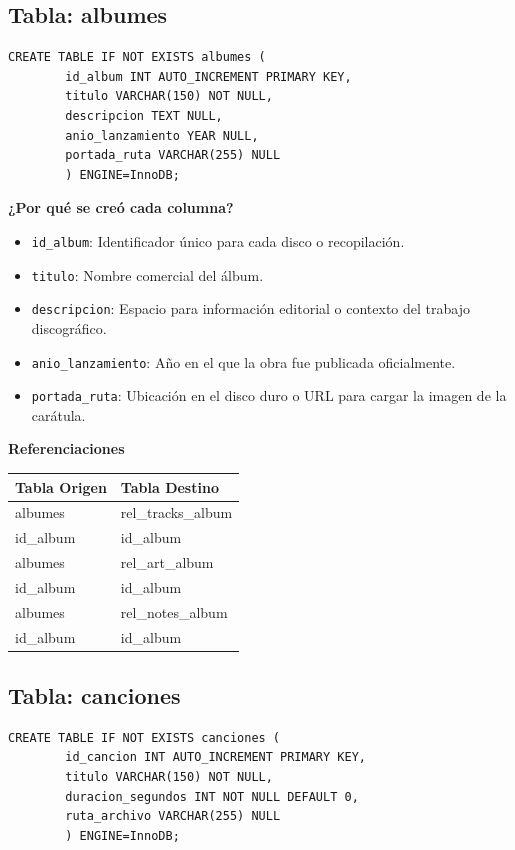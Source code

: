 \documentclass[11pt]{article}
\begin{document}
	\vspace{0.5cm}
	
	\subsection{Tabla: albumes}
	\begin{lstlisting}[style=sqlstyle]
		CREATE TABLE IF NOT EXISTS albumes (
		id_album INT AUTO_INCREMENT PRIMARY KEY,
		titulo VARCHAR(150) NOT NULL,
		descripcion TEXT NULL,
		anio_lanzamiento YEAR NULL,
		portada_ruta VARCHAR(255) NULL
		) ENGINE=InnoDB;
	\end{lstlisting}
	
	\noindent\textbf{¿Por qué se creó cada columna?}
	\begin{itemize}[noitemsep,topsep=2pt]
		\item \texttt{id\_album}: Identificador único para cada disco o recopilación.
		\item \texttt{titulo}: Nombre comercial del álbum.
		\item \texttt{descripcion}: Espacio para información editorial o contexto del trabajo discográfico.
		\item \texttt{anio\_lanzamiento}: Año en el que la obra fue publicada oficialmente.
		\item \texttt{portada\_ruta}: Ubicación en el disco duro o URL para cargar la imagen de la carátula.
	\end{itemize}
	
	\vspace{0.3cm}
	\noindent\textbf{Referenciaciones} \\[0.3em]
	\begin{tabular}{|l|l|}
		\hline
		\textbf{Tabla Origen} & \textbf{Tabla Destino} \\
		\hline
		albumes & rel\_tracks\_album \\
		id\_album & id\_album \\
		\hline
		albumes & rel\_art\_album \\
		id\_album & id\_album \\
		\hline
		albumes & rel\_notes\_album \\
		id\_album & id\_album \\
		\hline
	\end{tabular}
	
	\vspace{0.5cm}
	
	\subsection{Tabla: canciones}
	\begin{lstlisting}[style=sqlstyle]
		CREATE TABLE IF NOT EXISTS canciones (
		id_cancion INT AUTO_INCREMENT PRIMARY KEY,
		titulo VARCHAR(150) NOT NULL,
		duracion_segundos INT NOT NULL DEFAULT 0,
		ruta_archivo VARCHAR(255) NULL
		) ENGINE=InnoDB;
	\end{lstlisting}
	
\end{document}
